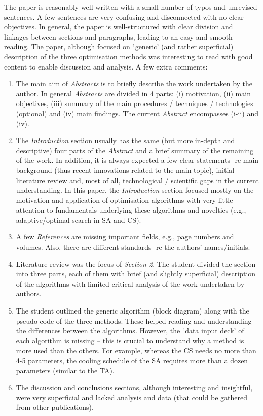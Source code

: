 \documentclass[14pt,twoside]{report}
\begin{document}
The paper is reasonably well-written with a small number of typos and unrevised sentences. A few sentences are very confusing and disconnected with no clear objectives. In general, the paper is well-structured with clear division and linkages between sections and paragraphs, leading to an easy and smooth reading. The paper, although focused on $\lq$generic' (and rather superficial) description of the three optimisation methods was interesting to read with good content to enable discussion and analysis. A few extra comments:
\begin{enumerate}
\item The main aim of {\it Abstracts} is to briefly describe the work undertaken by the author. In general {\it Abstracts} are divided in 4 parts: (i) motivation, (ii) main objectives, (iii) summary of the main procedures / techniques / technologies (optional) and (iv) main findings. The current {\it Abstract} encompasses (i-ii) and (iv).
%
\item The {\it Introduction} section usually has the same (but more in-depth and descriptive) four parts of the {\it Abstract} and a brief summary of the remaining of the work. In addition, it is always expected a few clear statements -re main background (thus recent innovations related to the main topic), initial literature review and, most of all, technological / scientific gaps in the current understanding. In this paper, the {\it Introduction} section focused mostly on the motivation and application of optimisation algorithms with very little attention to fundamentals underlying these algorithms and novelties (e.g., adaptive/optimal search in SA and CS). 
%
\item A few {\it References} are missing important fields, e.g., page numbers and volumes. Also, there are different standards -re the authors' names/initials.
%
\item Literature review was the focus of {\it Section 2}. The student divided the section into three parts, each of them with brief (and slightly superficial) description of the algorithms with limited critical analysis of the work undertaken by authors. 
%
\item The student outlined the generic algorithm (block diagram) along with the pseudo-code of the three methods. These helped reading and understanding the differences between the algorithms. However, the $\lq$data input deck' of each algorithm is missing -- this is crucial to understand why a method is more used than the others. For example, whereas the CS needs no more than 4-5 parameters, the cooling schedule of the SA requires more than a dozen parameters (similar to the TA).   
%
\item The discussion and conclusions sections, although interesting and insightful, were very superficial and lacked analysis and data (that could be gathered from other publications). 
\end{enumerate}
\end{document}
